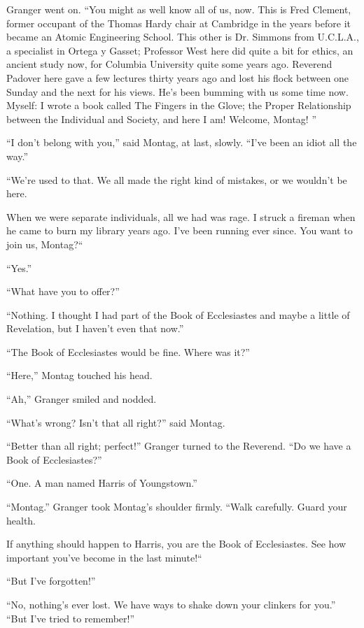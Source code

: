 \documentclass[11pt,openany]{book}
\begin{document}
Granger went on. ``You might as well know all of us, now. This is Fred Clement, former occupant of the Thomas Hardy chair at Cambridge in the years before it became an Atomic Engineering School. This other is Dr. Simmons from U.C.L.A., a specialist in Ortega y Gasset; Professor West here did quite a bit for ethics, an ancient study now, for Columbia University quite some years ago. Reverend Padover here gave a few lectures thirty years ago and lost his flock between one Sunday and the next for his views. He's been bumming with us some time now. Myself: I wrote a book called The Fingers in the Glove; the Proper Relationship between the Individual and Society, and here I am! Welcome, Montag! ''

``I don't belong with you,'' said Montag, at last, slowly. ``I've been an idiot all the way.''

``We're used to that. We all made the right kind of mistakes, or we wouldn't be here.

When we were separate individuals, all we had was rage. I struck a fireman when he came to burn my library years ago. I've been running ever since. You want to join us, Montag?``

``Yes.''

``What have you to offer?''

``Nothing. I thought I had part of the Book of Ecclesiastes and maybe a little of Revelation, but I haven't even that now.''

``The Book of Ecclesiastes would be fine. Where was it?''

``Here,'' Montag touched his head.

``Ah,'' Granger smiled and nodded.

``What's wrong? Isn't that all right?'' said Montag.

``Better than all right; perfect!'' Granger turned to the Reverend. ``Do we have a Book of Ecclesiastes?''

``One. A man named Harris of Youngstown.''

``Montag.'' Granger took Montag's shoulder firmly. ``Walk carefully. Guard your health.

If anything should happen to Harris, you are the Book of Ecclesiastes. See how important you've become in the last minute!``

``But I've forgotten!''

``No, nothing's ever lost. We have ways to shake down your clinkers for you.'' ``But I've tried to remember!''
\end{document}
